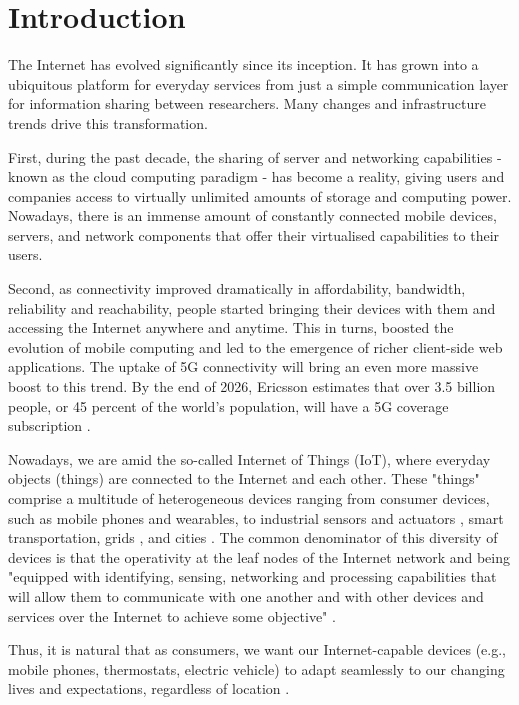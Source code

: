 \chapter{Introduction}
\label{sec:introduction}

The Internet has evolved significantly since its inception. It has grown into a ubiquitous platform for everyday services from just a simple communication layer for information sharing between researchers. Many changes and infrastructure trends drive this transformation.

First, during the past decade, the sharing of server and networking capabilities - known as the cloud computing paradigm - has become a reality, giving users and companies access to virtually unlimited amounts of storage and computing power. Nowadays, there is an immense amount of constantly connected mobile devices, servers, and network components that offer their virtualised capabilities to their users.

Second, as connectivity improved dramatically in affordability, bandwidth, reliability and reachability, people started bringing their devices with them and accessing the Internet anywhere and anytime. This in turns, boosted the evolution of mobile computing and led to the emergence of richer client-side web applications. The uptake of 5G connectivity will bring an even more massive boost to this trend. By the end of 2026, Ericsson estimates that over 3.5 billion people, or 45 percent of the world's population, will have a 5G coverage subscription \cite{ericsson-5g}.

Nowadays, we are amid the so-called Internet of Things (IoT), where everyday objects (things) are connected to the Internet and each other. These "things" comprise a multitude of heterogeneous devices ranging from consumer devices, such as mobile phones and wearables, to industrial sensors and actuators \cite{iot-manifacturing}, smart transportation, grids \cite{dsu}, and cities \cite{saaas}. The common denominator of this diversity of devices is that the operativity at the leaf nodes of the Internet network and being "equipped with identifying, sensing, networking and processing capabilities that will allow them to communicate with one another and with other devices and services over the Internet to achieve some objective" \cite{iot-definition}.

Thus, it is natural that as consumers, we want our Internet-capable devices (e.g., mobile phones, thermostats, electric vehicle) to adapt seamlessly to our changing lives and expectations, regardless of location \cite{harnessing-continuum}.

